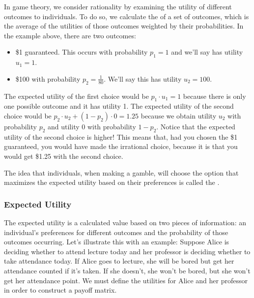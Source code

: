 \documentclass[letterpaper,10pt,english]{jupyterBook}
\begin{document}
\sphinxAtStartPar
In game theory, we consider rationality by examining the utility of different outcomes to individuals. To do so, we calculate the  of a set of outcomes, which is the average of the utilities of those outcomes weighted by their probabilities. In the example above, there are two outcomes:
\begin{itemize}
\item {} 
\sphinxAtStartPar
\$1 guaranteed. This occurs with probability \(p_1=1\) and we’ll say has utility \(u_1 = 1\).

\item {} 
\sphinxAtStartPar
\$100 with probability \(p_2 = \frac{1}{80}\). We’ll say this has utility \(u_2 = 100\).

\end{itemize}

\sphinxAtStartPar
The expected utility of the first choice would be \(p_1 \cdot u_1 = 1\) because there is only one possible outcome and it has utility 1. The expected utility of the second choice would be \(p_2 \cdot u_2 + (1 - p_2) \cdot 0 = 1.25\) because we obtain utility \(u_2\) with probability \(p_2\) and utility 0 with probability \(1-p_2\). Notice that the expected utility of the second choice is higher! This means that, had you chosen the \$1 guaranteed, you would have made the irrational choice, because it is  that you would get \$1.25 with the second choice.

\sphinxAtStartPar
The idea that individuals, when making a gamble, will choose the option that maximizes the expected utility based on their preferences is called the .


\subsubsection{Expected Utility}
\label{\detokenize{content/07-game-theory/expected-utility:expected-utility}}
\sphinxAtStartPar
The expected utility is a calculated value based on two pieces of information: an individual’s preferences for different outcomes and the probability of those outcomes occurring. Let’s illustrate this with an example: Suppose Alice is deciding whether to attend lecture today and her professor is deciding whether to take attendance today. If Alice goes to lecture, she will be bored but get her attendance counted if it’s taken. If she doesn’t, she won’t be bored, but she  won’t get her attendance point. We must define the utilities for Alice and her professor in order to construct a payoff matrix.
\end{document}

